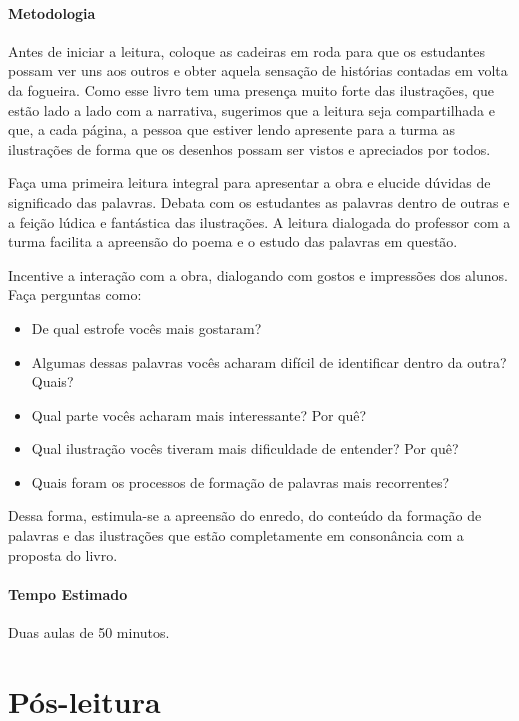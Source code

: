 \documentclass[11pt]{extarticle}
\begin{document}
\paragraph{Metodologia} Antes de iniciar a leitura, coloque as cadeiras em roda para que os estudantes possam ver uns aos outros e obter aquela sensação de histórias contadas em volta da fogueira. Como esse livro tem uma presença muito forte das ilustrações, que estão lado a lado com a narrativa, sugerimos que a leitura seja compartilhada e que, a cada página, a pessoa que estiver lendo apresente para a turma as ilustrações de forma que os desenhos possam ser vistos e apreciados por todos. 

Faça uma primeira leitura integral para apresentar a obra e elucide dúvidas de significado das palavras. Debata com os estudantes as palavras dentro de outras e a feição lúdica e fantástica das ilustrações. A leitura dialogada do professor com a turma facilita a apreensão do poema e o estudo das palavras em questão.

Incentive a interação com a obra, dialogando com gostos e impressões dos alunos. Faça perguntas como:

\begin{itemize}
\item De qual estrofe vocês mais gostaram?
\item Algumas dessas palavras vocês acharam difícil de identificar dentro da outra? Quais?
\item Qual parte vocês acharam mais interessante? Por quê?
\item Qual ilustração vocês tiveram mais dificuldade de entender? Por quê?
\item Quais foram os processos de formação de palavras mais recorrentes?
\end{itemize}

Dessa forma, estimula-se a apreensão do enredo, do conteúdo da formação de palavras e das ilustrações que estão completamente em consonância com a proposta do livro.

\paragraph{Tempo Estimado} Duas aulas de 50 minutos. 

\section{Pós-leitura}

\end{document}
